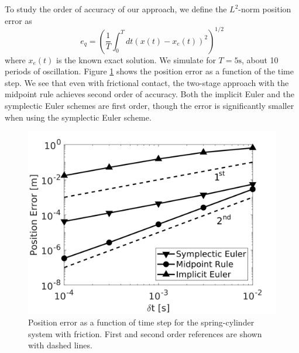 To study the order of accuracy of our approach, we define the $L^2$-norm position error as
\begin{equation*}
    e_q = \left(\frac{1}{T}\int_0^T dt(x(t)-x_e(t))^2\right)^{1/2}
\end{equation*}
where $x_e(t)$ is the known exact solution. We simulate for $T=5\text{
s}$, about 10 periods of oscillation. Figure \ref{fig:spring_cylinder_position_error} shows the position error as
a function of the time step. We see that even with frictional contact, the two-stage approach
with the midpoint rule achieves second order of accuracy. Both the implicit Euler and the symplectic Euler schemes are first order,
though the error is significantly smaller when using the symplectic Euler
scheme.
\begin{figure}[!h]
	\centering
	\includegraphics[width=0.7\columnwidth]{figures/spring_cylinder/position_error.png}
	\caption{\label{fig:spring_cylinder_position_error} 
	Position error as a function of time step for the spring-cylinder system
	with friction. First and second order references are shown with dashed
	lines.}
\end{figure}